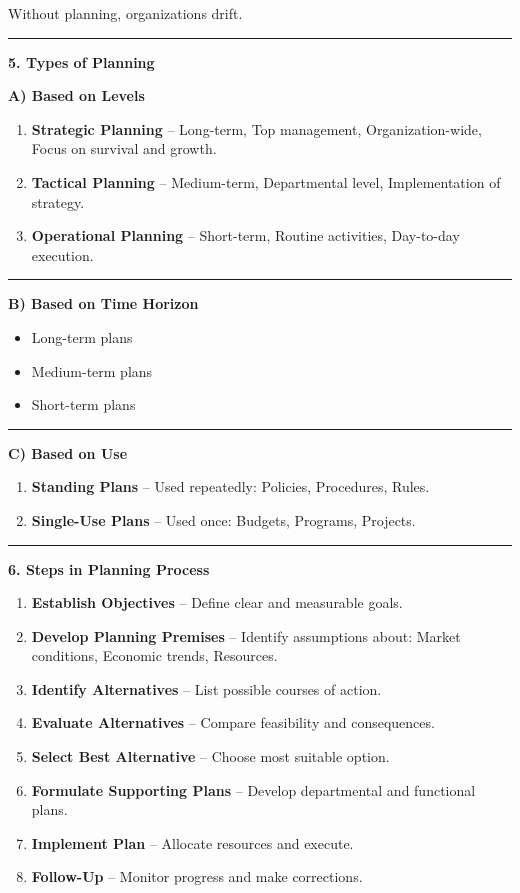 \documentclass[10pt,a4paper]{article}
\newcommand{\separator}{\vspace{0.4em}\noindent\rule{\linewidth}{0.6pt}\vspace{0.4em}}
\begin{document}
Without planning, organizations drift.

\separator

\textbf{5. Types of Planning}

\textbf{A) Based on Levels}

\begin{enumerate}
  \item \textbf{Strategic Planning} -- Long-term, Top management, Organization-wide, Focus on survival and growth.
  \item \textbf{Tactical Planning} -- Medium-term, Departmental level, Implementation of strategy.
  \item \textbf{Operational Planning} -- Short-term, Routine activities, Day-to-day execution.
\end{enumerate}

\separator

\textbf{B) Based on Time Horizon}

\begin{itemize}
  \item Long-term plans
  \item Medium-term plans
  \item Short-term plans
\end{itemize}

\separator

\textbf{C) Based on Use}

\begin{enumerate}
  \item \textbf{Standing Plans} -- Used repeatedly: Policies, Procedures, Rules.
  \item \textbf{Single-Use Plans} -- Used once: Budgets, Programs, Projects.
\end{enumerate}

\separator

\textbf{6. Steps in Planning Process}

\begin{enumerate}
  \item \textbf{Establish Objectives} -- Define clear and measurable goals.
  \item \textbf{Develop Planning Premises} -- Identify assumptions about: Market conditions, Economic trends, Resources.
  \item \textbf{Identify Alternatives} -- List possible courses of action.
  \item \textbf{Evaluate Alternatives} -- Compare feasibility and consequences.
  \item \textbf{Select Best Alternative} -- Choose most suitable option.
  \item \textbf{Formulate Supporting Plans} -- Develop departmental and functional plans.
  \item \textbf{Implement Plan} -- Allocate resources and execute.
  \item \textbf{Follow-Up} -- Monitor progress and make corrections.
\end{enumerate}
\end{document}
